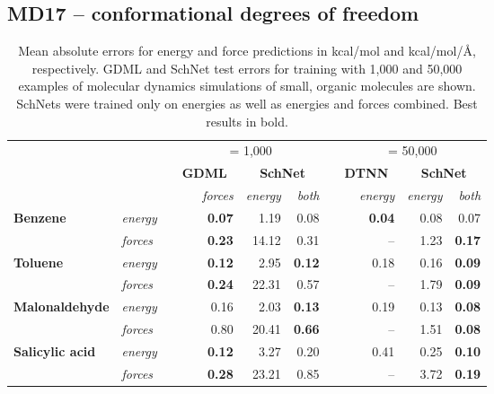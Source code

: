 \documentclass{article}
\begin{document}
\subsection{MD17 -- conformational degrees of freedom}
\setlength{\tabcolsep}{5pt}
\begin{table}
\caption{Mean absolute errors for energy and force predictions in kcal/mol and kcal/mol/\AA, respectively. GDML and SchNet test errors for training with 1,000 and 50,000 examples of molecular dynamics simulations of small, organic molecules are shown. SchNets were trained only on energies as well as energies and forces combined. Best results in bold.}\label{tab:md}
\centering
\small
\begin{tabular}{llrrrrrrrr}
\toprule
 & & & \multicolumn{3}{c}{ = 1,000} & & \multicolumn{3}{c}{ = 50,000}\\ \cmidrule{4-6} \cmidrule{8-10}
& & & \textbf{GDML}~\citep{chmiela2017machine} & \multicolumn{2}{c}{\textbf{SchNet}} & & \textbf{DTNN}~\citep{schutt2017quantum} & \multicolumn{2}{c}{\textbf{SchNet}} \\
& & & \textit{forces} &  \textit{energy} & \textit{both} & & \textit{energy} & \textit{energy} & \textit{both} \\ \cmidrule{1-2} \cmidrule{4-6} \cmidrule{8-10}
\multirow{2}{*}{\textbf{Benzene}} 		 & \textit{energy} & & \textbf{0.07} & 1.19 & 0.08  && \textbf{0.04} & 0.08 & 0.07 \\
						 		 & \textit{forces} & & \textbf{0.23} & 14.12 & 0.31 && -- & 1.23 & \textbf{0.17} \\\cmidrule{1-2} \cmidrule{4-6} \cmidrule{8-10}
\multirow{2}{*}{\textbf{Toluene}} 		 & \textit{energy} & & \textbf{0.12} & 2.95 & \textbf{0.12}  && 0.18 & 0.16 & \textbf{0.09} \\
						 		 & \textit{forces} & & \textbf{0.24} & 22.31 & 0.57 && -- & 1.79 & \textbf{0.09} \\ \cmidrule{1-2} \cmidrule{4-6} \cmidrule{8-10}
\multirow{2}{*}{\textbf{Malonaldehyde}}  & \textit{energy} & & 0.16 & 2.03 & \textbf{0.13}  && 0.19 & 0.13 & \textbf{0.08} \\
								 & \textit{forces} & & 0.80 & 20.41 & \textbf{0.66} && -- & 1.51 & \textbf{0.08} \\\cmidrule{1-2} \cmidrule{4-6} \cmidrule{8-10}
\multirow{2}{*}{\textbf{Salicylic acid}} & \textit{energy} & & \textbf{0.12} & 3.27 & 0.20  && 0.41 & 0.25 & \textbf{0.10} \\
								 & \textit{forces} & & \textbf{0.28} & 23.21 & 0.85 && -- & 3.72 & \textbf{0.19} \\ \cmidrule{1-2} \cmidrule{4-6} \cmidrule{8-10}

\end{tabular}
\end{table}
\end{document}
